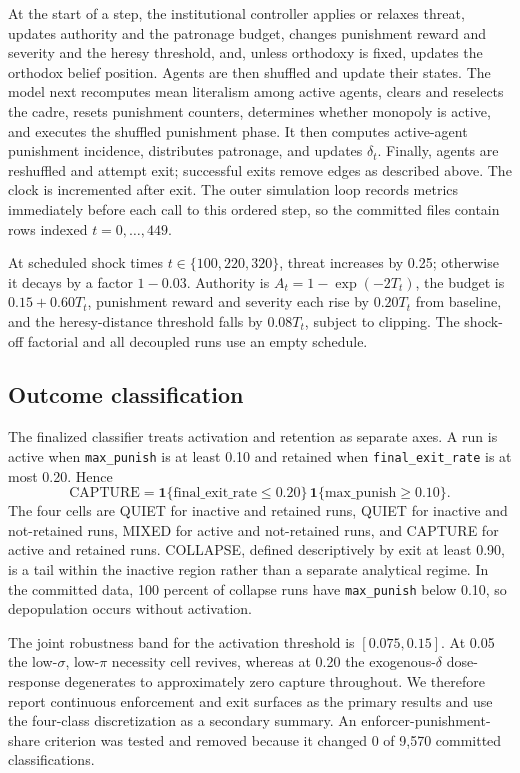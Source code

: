\documentclass[12pt]{article}
\begin{document}
At the start of a step, the institutional controller applies or relaxes threat, updates authority and the patronage budget, changes punishment reward and severity and the heresy threshold, and, unless orthodoxy is fixed, updates the orthodox belief position. Agents are then shuffled and update their states. The model next recomputes mean literalism among active agents, clears and reselects the cadre, resets punishment counters, determines whether monopoly is active, and executes the shuffled punishment phase. It then computes active-agent punishment incidence, distributes patronage, and updates \(\delta_t\). Finally, agents are reshuffled and attempt exit; successful exits remove edges as described above. The clock is incremented after exit. The outer simulation loop records metrics immediately before each call to this ordered step, so the committed files contain rows indexed \(t=0,\ldots,449\).

At scheduled shock times \(t\in\{100,220,320\}\), threat increases by 0.25; otherwise it decays by a factor \(1-0.03\). Authority is \(A_t=1-\exp(-2T_t)\), the budget is \(0.15+0.60T_t\), punishment reward and severity each rise by \(0.20T_t\) from baseline, and the heresy-distance threshold falls by \(0.08T_t\), subject to clipping. The shock-off factorial and all decoupled runs use an empty schedule.

\subsection{Outcome classification}

The finalized classifier treats activation and retention as separate axes. A run is active when \texttt{max\_punish} is at least 0.10 and retained when \texttt{final\_exit\_rate} is at most 0.20. Hence
\begin{equation}
 \mathrm{CAPTURE}=\mathbf{1}\{\mathrm{final\_exit\_rate}\leq0.20\}\,\mathbf{1}\{\mathrm{max\_punish}\geq0.10\}.
\end{equation}
The four cells are QUIET for inactive and retained runs, QUIET for inactive and not-retained runs, MIXED for active and not-retained runs, and CAPTURE for active and retained runs. COLLAPSE, defined descriptively by exit at least 0.90, is a tail within the inactive region rather than a separate analytical regime. In the committed data, 100 percent of collapse runs have \texttt{max\_punish} below 0.10, so depopulation occurs without activation.

The joint robustness band for the activation threshold is \([0.075,0.15]\). At 0.05 the low-\(\sigma\), low-\(\pi\) necessity cell revives, whereas at 0.20 the exogenous-\(\delta\) dose-response degenerates to approximately zero capture throughout. We therefore report continuous enforcement and exit surfaces as the primary results and use the four-class discretization as a secondary summary. An enforcer-punishment-share criterion was tested and removed because it changed 0 of 9,570 committed classifications.
\end{document}
